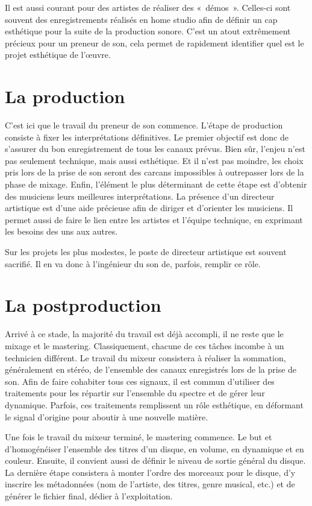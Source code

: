 \documentclass[
  letterpaper,
  DIV=11,
  numbers=noendperiod]{scrreprt}
\begin{document}
Il est aussi courant pour des artistes de réaliser des «~démos~».
Celles-ci sont souvent des enregistrements réalisés en home studio afin
de définir un cap esthétique pour la suite de la production sonore.
C'est un atout extrêmement précieux pour un preneur de son, cela permet
de rapidement identifier quel est le projet esthétique de l'œuvre.

\hypertarget{la-production}{%
\section{La production}\label{la-production}}

C'est ici que le travail du preneur de son commence. L'étape de
production consiste à fixer les interprétations définitives. Le premier
objectif est donc de s'assurer du bon enregistrement de tous les canaux
prévus. Bien sûr, l'enjeu n'est pas seulement technique, mais aussi
esthétique. Et il n'est pas moindre, les choix pris lors de la prise de
son seront des carcans impossibles à outrepasser lors de la phase de
mixage. Enfin, l'élément le plus déterminant de cette étape est
d'obtenir des musiciens leurs meilleures interprétations. La présence
d'un directeur artistique est d'une aide précieuse afin de diriger et
d'orienter les musiciens. Il permet aussi de faire le lien entre les
artistes et l'équipe technique, en exprimant les besoins des uns aux
autres.

Sur les projets les plus modestes, le poste de directeur artistique est
souvent sacrifié. Il en va donc à l'ingénieur du son de, parfois,
remplir ce rôle.

\hypertarget{la-postproduction}{%
\section{La postproduction}\label{la-postproduction}}

Arrivé à ce stade, la majorité du travail est déjà accompli, il ne reste
que le mixage et le mastering. Classiquement, chacune de ces tâches
incombe à un technicien différent. Le travail du mixeur consistera à
réaliser la sommation, généralement en stéréo, de l'ensemble des canaux
enregistrés lors de la prise de son. Afin de faire cohabiter tous ces
signaux, il est commun d'utiliser des traitements pour les répartir sur
l'ensemble du spectre et de gérer leur dynamique. Parfois, ces
traitements remplissent un rôle esthétique, en déformant le signal
d'origine pour aboutir à une nouvelle matière.

Une fois le travail du mixeur terminé, le mastering commence. Le but et
d'homogénéiser l'ensemble des titres d'un disque, en volume, en
dynamique et en couleur. Ensuite, il convient aussi de définir le niveau
de sortie général du disque. La dernière étape consistera à monter
l'ordre des morceaux pour le disque, d'y inscrire les métadonnées (nom
de l'artiste, des titres, genre musical, etc.) et de générer le fichier
final, dédier à l'exploitation.
\end{document}
